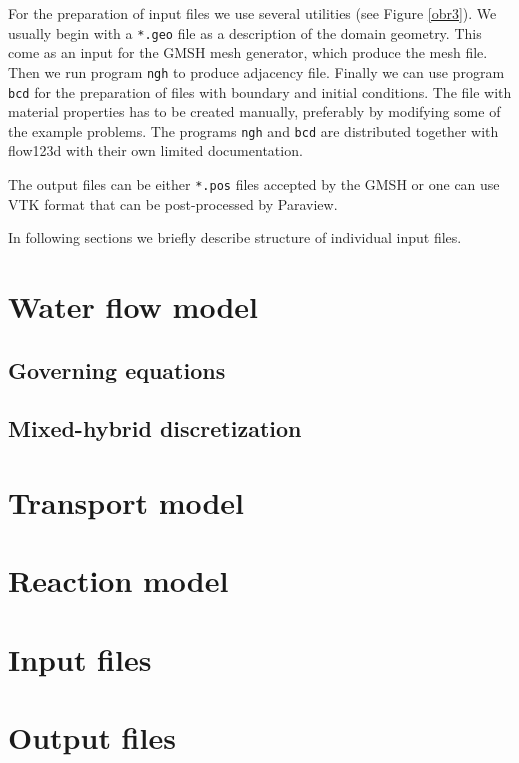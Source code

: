 \documentclass[12pt,a4paper]{report}
\begin{document}
For the preparation of input files we use several utilities (see Figure \ref{obr3}). 
We usually begin with a \verb'*.geo' file as a description of the domain geometry. This come as an input for the GMSH mesh generator, which produce 
the mesh file. Then we run program \verb'ngh' to produce adjacency file. Finally we can use program \verb'bcd' for the preparation of files with
boundary and initial conditions. The file with material properties has to be created manually, preferably by modifying some of the example problems.
The programs \verb'ngh' and \verb'bcd' are distributed together with flow123d with their own limited documentation.

The output files can be either \verb'*.pos' files accepted by the GMSH or one can use VTK format that can be post-processed by Paraview.

In following sections we briefly describe structure of individual input files.

\section{Water flow model}
\subsection{Governing equations}
\subsection{Mixed-hybrid discretization}

\section{Transport model}




\section{Reaction model}

\section{Input files}

 


 
  
 
   

\section{Output files}

\end{document}

